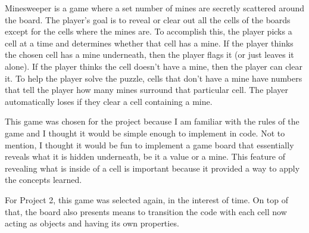 Minesweeper is a game where a set number of mines are secretly scattered around the board. The player’s goal is to reveal or clear out all the cells of the boards except for the cells where the mines are. To accomplish this, the player picks a cell at a time and determines whether that cell has a mine. If the player thinks the chosen cell has a mine underneath, then the player flags it (or just leaves it alone). If the player thinks the cell doesn’t have a mine, then the player can clear it. To help the player solve the puzzle, cells that don’t have a mine have numbers that tell the player how many mines surround that particular cell. The player automatically loses if they clear a cell containing a mine.

This game was chosen for the project because I am familiar with the rules of the game and I thought it would be simple enough to implement in code. Not to mention, I thought it would be fun to implement a game board that essentially reveals what it is hidden underneath, be it a value or a mine. This feature of revealing what is inside of a cell is important because it provided a way to apply the concepts learned.

For Project 2, this game was selected again, in the interest of time. On top of that, the board also presents means to transition the code with each cell now acting as objects and having its own properties. ~\newline
 